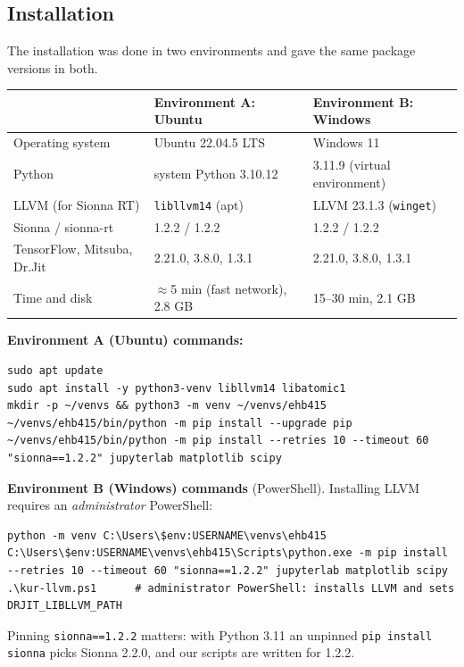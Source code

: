 \documentclass[10.5pt,a4paper]{article}
\newenvironment{codebox}{\par\noindent\begin{minipage}{\textwidth}}{\end{minipage}\par}
\begin{document}
\subsection{Installation}
The installation was done in two environments and gave the same package versions in both.
\begin{center}\sffamily\small
\begin{tabular}{@{}lll@{}}
\toprule
 & \textbf{Environment A: Ubuntu} & \textbf{Environment B: Windows} \\
\midrule
Operating system & Ubuntu 22.04.5 LTS & Windows 11 \\
Python & system Python 3.10.12 & 3.11.9 (virtual environment) \\
LLVM (for Sionna RT) & \texttt{libllvm14} (apt) & LLVM 23.1.3 (\texttt{winget}) \\
Sionna / sionna-rt & 1.2.2 / 1.2.2 & 1.2.2 / 1.2.2 \\
TensorFlow, Mitsuba, Dr.Jit & 2.21.0, 3.8.0, 1.3.1 & 2.21.0, 3.8.0, 1.3.1 \\
Time and disk & $\approx$5 min (fast network), 2.8 GB & 15--30 min, 2.1 GB \\
\bottomrule
\end{tabular}
\end{center}
\begin{codebox}\textbf{Environment A (Ubuntu) commands:}\par
\begin{lstlisting}
sudo apt update
sudo apt install -y python3-venv libllvm14 libatomic1
mkdir -p ~/venvs && python3 -m venv ~/venvs/ehb415
~/venvs/ehb415/bin/python -m pip install --upgrade pip
~/venvs/ehb415/bin/python -m pip install --retries 10 --timeout 60 "sionna==1.2.2" jupyterlab matplotlib scipy
\end{lstlisting}
\end{codebox}
\begin{codebox}\textbf{Environment B (Windows) commands} (PowerShell). Installing LLVM requires an \emph{administrator} PowerShell:\par
\begin{lstlisting}
python -m venv C:\Users\$env:USERNAME\venvs\ehb415
C:\Users\$env:USERNAME\venvs\ehb415\Scripts\python.exe -m pip install --retries 10 --timeout 60 "sionna==1.2.2" jupyterlab matplotlib scipy
.\kur-llvm.ps1      # administrator PowerShell: installs LLVM and sets DRJIT_LIBLLVM_PATH
\end{lstlisting}
\end{codebox}
Pinning \texttt{sionna==1.2.2} matters: with Python 3.11 an unpinned \texttt{pip install sionna} picks Sionna 2.2.0, and our scripts are written for 1.2.2.
\end{document}
